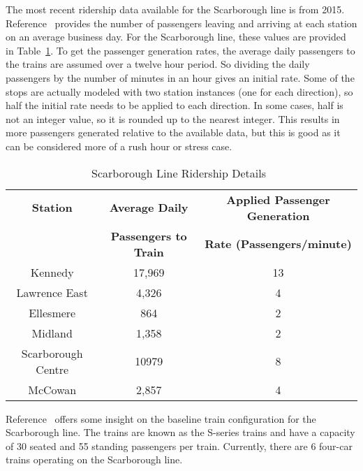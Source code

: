 The most recent ridership data available for the Scarborough line is from 2015. Reference~ provides the number of passengers leaving and arriving at each station on an average business day.  For the Scarborough line, these values are provided in Table~\ref{table:ridership}.  To get the passenger generation rates, the average daily passengers to the trains are assumed over a twelve hour period.  So dividing the daily passengers by the number of minutes in an hour gives an initial rate.  Some of the stops are actually modeled with two station instances (one for each direction), so half the initial rate needs to be applied to each direction.  In some cases, half is not an integer value, so it is rounded up to the nearest integer.  This results in more passengers generated relative to the available data, but this is good as it can be considered more of a rush hour or stress case.
%
\begin{table}[htb]
	\centering
	\begin{tabular}{c|c|c}
		\textbf{Station} & \textbf{Average Daily} & \textbf{Applied Passenger Generation} \\
		                 & \textbf{Passengers to Train} & \textbf{Rate (Passengers/minute)} \\
		\hline\hline
		Kennedy & 17,969 & 13 \\
		Lawrence East & 4,326 & 4 \\
		Ellesmere & 864 & 2 \\
		Midland & 1,358 & 2 \\
		Scarborough Centre & 10979 & 8 \\
		McCowan & 2,857 & 4 \\
	\end{tabular}
\caption{Scarborough Line Ridership Details~\cite{ridershipdata}}
\label{table:ridership}
\end{table}

Reference~ offers some insight on the baseline train configuration for the Scarborough line.  The trains are known as the S-series trains and have a capacity of 30 seated and 55 standing passengers per train.  Currently, there are 6 four-car trains operating on the Scarborough line.

\FloatBarrier
